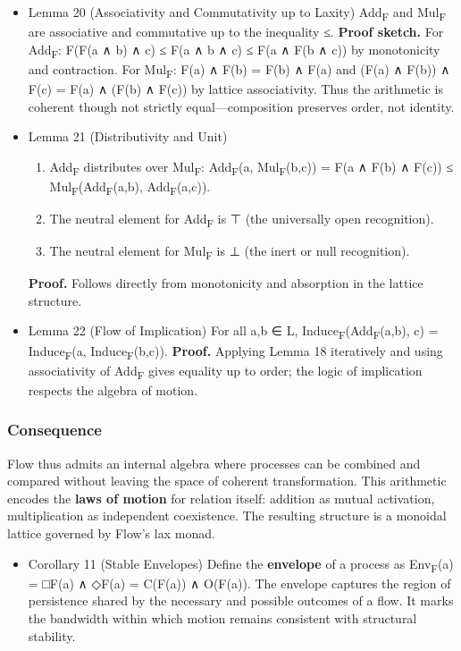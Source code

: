 \documentclass[11pt]{article}
\begin{document}
\begin{itemize}
\begin{enumerate}
\item \textbf{Scalar propagation} (iteration):  
Fⁿ(a) = F(F(\ldots{}F(a)\ldots{}))  (n times);  
in the lax-idempotent regime, F²(a) ≤ F(a), hence the sequence stabilizes to F(a).
\end{enumerate}
\item Lemma 20 (Associativity and Commutativity up to Laxity)
\label{sec:orgd634a9c}
Add\textsubscript{F} and Mul\textsubscript{F} are associative and commutative up to the inequality ≤.  
\textbf{Proof sketch.}  
For Add\textsubscript{F}:  F(F(a ∧ b) ∧ c) ≤ F(a ∧ b ∧ c) ≤ F(a ∧ F(b ∧ c)) by monotonicity and contraction.  
For Mul\textsubscript{F}:  F(a) ∧ F(b) = F(b) ∧ F(a) and (F(a) ∧ F(b)) ∧ F(c) = F(a) ∧ (F(b) ∧ F(c)) by lattice associativity.  
Thus the arithmetic is coherent though not strictly equal—composition preserves order, not identity.
\item Lemma 21 (Distributivity and Unit)
\label{sec:org9a32730}
\begin{enumerate}
\item Add\textsubscript{F} distributes over Mul\textsubscript{F}:  
Add\textsubscript{F}(a, Mul\textsubscript{F}(b,c)) = F(a ∧ F(b) ∧ F(c)) ≤ Mul\textsubscript{F}(Add\textsubscript{F}(a,b), Add\textsubscript{F}(a,c)).
\item The neutral element for Add\textsubscript{F} is ⊤ (the universally open recognition).
\item The neutral element for Mul\textsubscript{F} is ⊥ (the inert or null recognition).
\end{enumerate}
\textbf{Proof.}  Follows directly from monotonicity and absorption in the lattice structure.
\item Lemma 22 (Flow of Implication)
\label{sec:org1ed0cb0}
For all a,b ∈ L,  
Induce\textsubscript{F}(Add\textsubscript{F}(a,b), c) = Induce\textsubscript{F}(a, Induce\textsubscript{F}(b,c)).  
\textbf{Proof.}  Applying Lemma 18 iteratively and using associativity of Add\textsubscript{F} gives equality up to order;  
the logic of implication respects the algebra of motion.
\end{itemize}
\subsubsection*{Consequence}
\label{sec:org9eb13b2}
Flow thus admits an internal algebra where processes can be combined and compared without leaving the space of coherent transformation.  
This arithmetic encodes the \textbf{laws of motion} for relation itself:  
addition as mutual activation, multiplication as independent coexistence.  
The resulting structure is a monoidal lattice governed by Flow’s lax monad.
\begin{itemize}
\item Corollary 11 (Stable Envelopes)
\label{sec:org829b42c}
Define the \textbf{envelope} of a process as  
Env\textsubscript{F}(a) = □F(a) ∧ ◇F(a) = C(F(a)) ∧ O(F(a)).  
The envelope captures the region of persistence shared by the necessary and possible outcomes of a flow.  
It marks the bandwidth within which motion remains consistent with structural stability.
\end{itemize}
\end{document}
